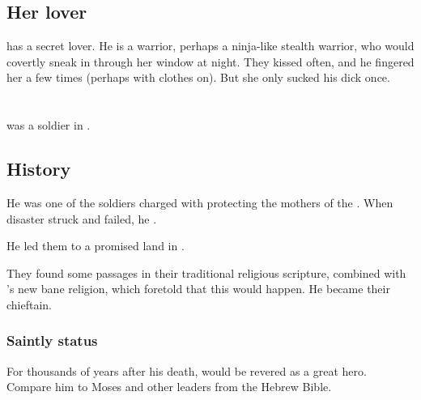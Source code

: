 \subsection{Her lover}
\Ilu{} has a secret lover. He is a warrior, perhaps a ninja-like stealth warrior, who would covertly sneak in through her window at night. They kissed often, and he fingered her a few times (perhaps with clothes on). But she only sucked his dick once. 















\section{\Morza}
\index{\Morza}
\Morza was a \nephil soldier in .









\subsection{History}
He was one of the soldiers charged with protecting the mothers of the \resphain.
When disaster struck and \Thanatzil failed, he .

He led them to a promised land in \Nyx.

They found some passages in their traditional religious scripture, combined with \Semiza's new bane religion, which foretold that this would happen.
He became their chieftain.





\subsubsection{Saintly status}
For thousands of years after his death, \Morza would be revered as a great hero.
Compare him to Moses and other leaders from the Hebrew Bible.









